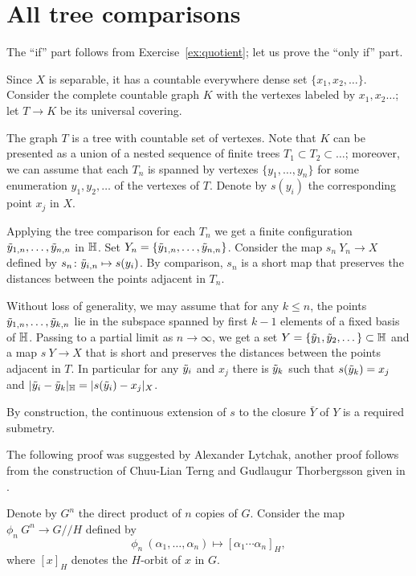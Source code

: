 \section{All tree comparisons}\label{sec:all-tree}


The ``if'' part follows from Exercise~\ref{ex:quotient};
let us prove the ``only if'' part.

Since $X$ is separable, it has a countable everywhere dense set $\{x_1,x_2,\dots\}$.
Consider the complete countable graph $K$ with the vertexes labeled by $x_1,x_2\dots$;
let $T\to K$ be its universal covering.

The graph $T$ is a tree with countable set of vertexes.
Note that $K$ can be presented as a union of a nested sequence of finite trees $T_1\subset T_2\subset \dots$;
moreover, we can assume that each $T_n$ is spanned by vertexes $\{y_1,\dots,y_n\}$ for some enumeration $y_1,y_2,\dots$ of the vertexes of $T$.
Denote by $s(y_i)$ the corresponding point $x_j$ in $X$.

Applying the tree comparison for each $T_n$ we get a finite configuration $\~y_{1,n},\dots,\~y_{n,n}$ in $\HH$.
Set $Y_n=\{\~y_{1,n},\dots,\~y_{n,n}\}$. 
Consider the map $s_n\:Y_n\to X$ defined by $s_n\:\~y_{i,n}\mapsto s(y_i)$.
By comparison, $s_n$ is a short map that preserves the distances between the points adjacent in $T_n$.

Without loss of generality, we may assume that for any $k\le n$, the points $\~y_{1,n},\dots,\~y_{k,n}$ lie in the subspace spanned by first $k-1$ elements of a fixed basis of $\HH$.
Passing to a partial limit as $n\to \infty$, we get a set $Y=\{\~y_1,\~y_2,\dots\}\subset \HH$ and a map $s\:Y\to X$ that is short and preserves the distances between the points adjacent in $T$.
In particular for any $\~y_i$ and $x_j$ there is $\~y_k$ such that $s(\~y_k)=x_j$ and $|\~y_i-\~y_k|_\HH=|s(\~y_i)-x_j|_X$.

By construction, the continuous extension of $s$ to the closure $\bar Y$ of $Y$ is a required submetry.
\qeds

The following proof was suggested by Alexander Lytchak, another proof follows from the construction of Chuu-Lian Terng and Gudlaugur Thorbergsson given in \cite[Section 4]{terng-thorbergsson}.


Denote by $G^n$ the direct product of $n$ copies of $G$.
Consider the map $\phi_n\:G^n\to G/\!\!/H$ defined by
\[\phi_n\:(\alpha_1,\dots,\alpha_n)\mapsto [\alpha_1\cdots\alpha_n]_H,\]
where $[x]_H$ denotes the $H$-orbit of $x$ in $G$.

